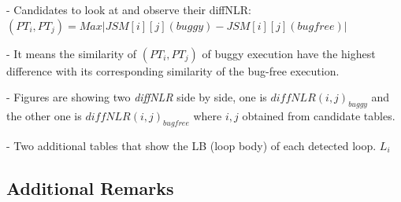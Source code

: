 - Candidates to look at and observe their diffNLR: $(PT_i, PT_j) = Max | JSM[i][j](buggy) - JSM[i][j](bugfree)| $

- It means the similarity of $(PT_i, PT_j)$ of buggy execution have the highest difference with its corresponding similarity of the bug-free execution.

- Figures are showing two \textit{diffNLR} side by side, one is $diffNLR(i,j)_{buggy}$ and the other one is  $diffNLR(i,j)_{bugfree}$ where $i, j$ obtained from candidate tables.

- Two additional tables that show the LB (loop body) of each detected loop. $L_i$

\subsection{Additional Remarks}
\label{subsec:addrem}
